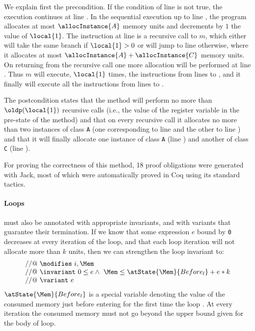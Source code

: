 We explain first the precondition. If the condition of line
 is not true, the execution continues at line
. In the sequential execution up to line , the
program allocates at most $\allocInstance{A}$ memory units and
decrements by $1$ the value of $\local{1}$. The instruction at line
 is a recursive call to $m$, which either will take the
same branch if $\local{1} > 0 $ or will jump to line 
otherwise, where it allocates at most $\allocInstance{A} +
\allocInstance{C}$ memory units. On returning from the recursive call
one more allocation will be performed at line .  Thus $m$
will execute, $\local{1}$ times, the instructions from lines
 to , and it finally will execute all the
instructions from lines  to .

The postcondition states that the method will perform no more than
$\oldp(\local{1})$ recursive calls (i.e., the value of the register
variable in the pre-state of the method) and that on every recursive
call it allocates no more than two instances of class \texttt{A} (one
corresponding to line  and the other to line )
and that it will finally allocate one instance of class \texttt{A}
(line ) and another of class \texttt{C} (line
).

For proving the correctness of this method, 18 proof obligations were
generated with Jack, most of which were automatically proved in Coq
using its standard tactics.


\paragraph{Loops} must also be annotated with appropriate invariants,
and with variants that guarantee their termination. If we know that
some expression $e$ bound by \verb!0! decreases at every
iteration of the loop, and that each loop iteration will not allocate
more than $k$ units, then we can strengthen the loop invariant
to:
$$\begin{array}{l}
//@ \ \modifies \ i, \Mem \\
//@ \ \invariant \ 0 \le e \wedge \ \Mem \le \atState{\Mem}{Before_{l}} + e * k \\

//@ \ \variant \ e
\end{array}$$
$\atState{\Mem}{Before_{l}}$ is a special variable denoting the value
of the consumed memory just before entering for the first time the
loop . At every iteration the consumed memory must not go
beyond the upper bound given for the body of loop.

